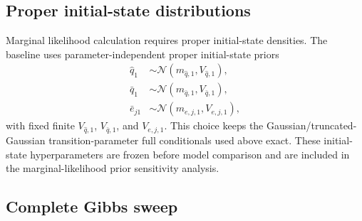 \documentclass[11pt]{article}
\newcommand{\Normal}{\mathcal{N}}
\begin{document}
\subsection{Proper initial-state distributions}

Marginal likelihood calculation requires proper initial-state densities. The baseline uses parameter-independent proper initial-state priors
\begin{align}
\hat q_1&\sim\Normal(m_{\hat q,1},V_{\hat q,1}),\\
\bar q_1&\sim\Normal(m_{\bar q,1},V_{\bar q,1}),\\
\bar e_{j1}&\sim\Normal(m_{e,j,1},V_{e,j,1}),
\end{align}
with fixed finite \(V_{\hat q,1}\), \(V_{\bar q,1}\), and \(V_{e,j,1}\). This choice keeps the Gaussian/truncated-Gaussian transition-parameter full conditionals used above exact. These initial-state hyperparameters are frozen before model comparison and are included in the marginal-likelihood prior sensitivity analysis.

\subsection{Complete Gibbs sweep}
\end{document}
